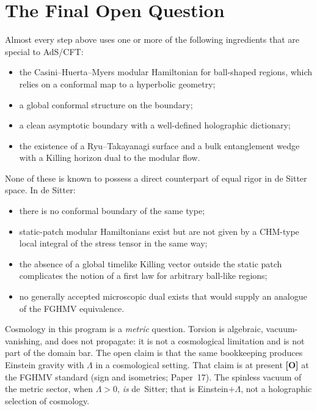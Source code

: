 \documentclass[11pt]{article}
\newcommand{\pO}{\textbf{[O]}}
\begin{document}
\section{The Final Open Question}
Almost every step above uses one or more of the following ingredients
that are special to AdS/CFT:
\begin{itemize}[leftmargin=1.4em]
\item the Casini--Huerta--Myers modular Hamiltonian for ball-shaped
regions, which relies on a conformal map to a hyperbolic geometry;
\item a global conformal structure on the boundary;
\item a clean asymptotic boundary with a well-defined holographic dictionary;
\item the existence of a Ryu--Takayanagi surface and a bulk entanglement
wedge with a Killing horizon dual to the modular flow.
\end{itemize}
None of these is known to possess a direct counterpart of equal rigor
in de Sitter space. In de Sitter:
\begin{itemize}[leftmargin=1.4em]
\item there is no conformal boundary of the same type;
\item static-patch modular Hamiltonians exist but are not given by a
CHM-type local integral of the stress tensor in the same way;
\item the absence of a global timelike Killing vector outside the static
patch complicates the notion of a first law for arbitrary ball-like
regions;
\item no generally accepted microscopic dual exists that would supply an
analogue of the FGHMV equivalence.
\end{itemize}
Cosmology in this program is a \emph{metric} question. Torsion is
algebraic, vacuum-vanishing, and does not propagate: it is not a
cosmological limitation and is not part of the domain bar. The open
claim is that the same bookkeeping produces Einstein gravity with
$\Lambda$ in a cosmological setting. That claim is at present \pO{}
at the FGHMV standard (sign and isometries; Paper~17). The spinless
vacuum of the metric sector, when $\Lambda>0$, \emph{is} de~Sitter;
that is Einstein$+\Lambda$, not a holographic selection of cosmology.
\end{document}
